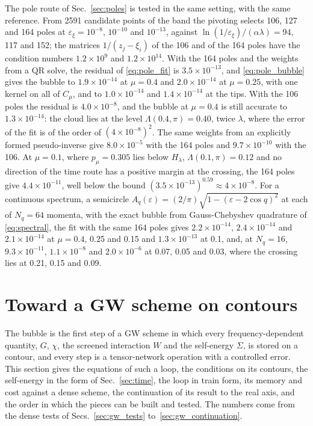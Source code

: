 \documentclass[aps,prb,reprint,a4paper]{revtex4-2}
\begin{document}
The pole route of Sec.~\ref{sec:poles} is tested in the same setting, with the same reference. From 2591 candidate points of the band the pivoting selects 106, 127 and 164 poles at $\varepsilon_\xi=10^{-8}$, $10^{-10}$ and $10^{-13}$, against $\ln(1/\varepsilon_\xi)/(\alpha\lambda)=94$, 117 and 152; the matrices $1/(z_j-\xi_i)$ of the 106 and of the 164 poles have the condition numbers $1.2\times10^{9}$ and $1.2\times10^{14}$. With the 164 poles and the weights from a QR solve, the residual of \eqref{eq:pole_fit} is $3.5\times10^{-13}$, and \eqref{eq:pole_bubble} gives the bubble to $1.9\times10^{-14}$ at $\mu=0.4$ and $2.0\times10^{-14}$ at $\mu=0.25$, with one kernel on all of $C_\mu$, and to $1.0\times10^{-14}$ and $1.4\times10^{-14}$ at the tips. With the 106 poles the residual is $4.0\times10^{-8}$, and the bubble at $\mu=0.4$ is still accurate to $1.3\times10^{-14}$: the cloud lies at the level $\Lambda(0.4,\pi)=0.40$, twice $\lambda$, where the error of the fit is of the order of $(4\times10^{-8})^2$. The same weights from an explicitly formed pseudo-inverse give $8.0\times10^{-5}$ with the 164 poles and $9.7\times10^{-10}$ with the 106. At $\mu=0.1$, where $p_\mu=0.305$ lies below $H_\lambda$, $\Lambda(0.1,\pi)=0.12$ and no direction of the time route has a positive margin at the crossing, the 164 poles give $4.4\times10^{-11}$, well below the bound $(3.5\times10^{-13})^{0.59}\approx4\times10^{-8}$. For a continuous spectrum, a semicircle $A_q(\varepsilon)=(2/\pi)\sqrt{1-(\varepsilon-2\cos q)^2}$ at each of $N_q=64$ momenta, with the exact bubble from Gauss-Chebyshev quadrature of \eqref{eq:spectral}, the fit with the same 164 poles gives $2.2\times10^{-14}$, $2.4\times10^{-14}$ and $2.1\times10^{-14}$ at $\mu=0.4$, 0.25 and 0.15 and $1.3\times10^{-13}$ at 0.1, and, at $N_q=16$, $9.3\times10^{-11}$, $1.1\times10^{-8}$ and $2.0\times10^{-6}$ at 0.07, 0.05 and 0.03, where the crossing lies at 0.21, 0.15 and 0.09.

\section{Toward a GW scheme on contours}
\label{sec:gw}

The bubble is the first step of a GW scheme in which every frequency-dependent quantity, $G$, $\chi$, the screened interaction $W$ and the self-energy $\Sigma$, is stored on a contour, and every step is a tensor-network operation with a controlled error. This section gives the equations of such a loop, the conditions on its contours, the self-energy in the form of Sec.~\ref{sec:time}, the loop in train form, its memory and cost against a dense scheme, the continuation of its result to the real axis, and the order in which the pieces can be built and tested. The numbers come from the dense tests of Secs.~\ref{sec:gw_tests} to~\ref{sec:gw_continuation}.
\end{document}
